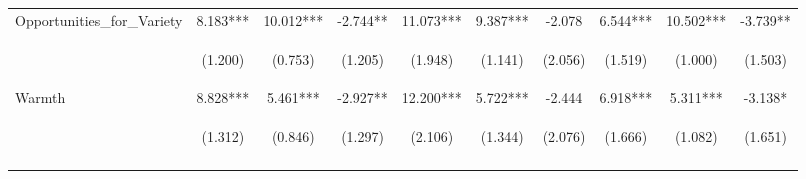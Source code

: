 \begin{tabular}{lccccccccc}
\noalign{\smallskip}Opportunities_for_Variety & 8.183*** & 10.012*** & -2.744** & 11.073*** & 9.387*** & -2.078 & 6.544*** & 10.502*** & -3.739**\\
 & \begin{footnotesize}(1.200)\end{footnotesize} & \begin{footnotesize}(0.753)\end{footnotesize} & \begin{footnotesize}(1.205)\end{footnotesize} & \begin{footnotesize}(1.948)\end{footnotesize} & \begin{footnotesize}(1.141)\end{footnotesize} & \begin{footnotesize}(2.056)\end{footnotesize} & \begin{footnotesize}(1.519)\end{footnotesize} & \begin{footnotesize}(1.000)\end{footnotesize} & \begin{footnotesize}(1.503)\end{footnotesize}\\
\noalign{\smallskip}Warmth & 8.828*** & 5.461*** & -2.927** & 12.200*** & 5.722*** & -2.444 & 6.918*** & 5.311*** & -3.138*\\
 & \begin{footnotesize}(1.312)\end{footnotesize} & \begin{footnotesize}(0.846)\end{footnotesize} & \begin{footnotesize}(1.297)\end{footnotesize} & \begin{footnotesize}(2.106)\end{footnotesize} & \begin{footnotesize}(1.344)\end{footnotesize} & \begin{footnotesize}(2.076)\end{footnotesize} & \begin{footnotesize}(1.666)\end{footnotesize} & \begin{footnotesize}(1.082)\end{footnotesize} & \begin{footnotesize}(1.651)\end{footnotesize}\\
\noalign{\smallskip}\hline\end{tabular}\\

